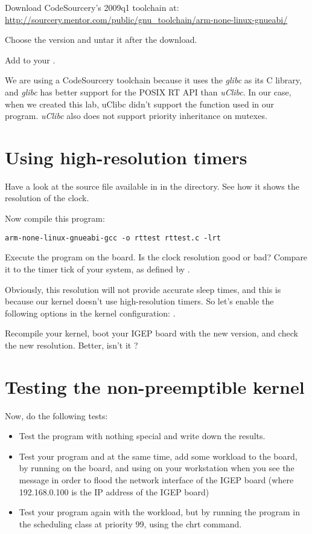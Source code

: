 Download CodeSourcery's 2009q1 toolchain at:
\url{http://sourcery.mentor.com/public/gnu_toolchain/arm-none-linux-gnueabi/}

Choose the 
version and untar it after the download.

Add  to your
.

We are using a CodeSourcery toolchain because it uses the {\em glibc}
as its C library, and {\em glibc} has better support for the POSIX RT
API than {\em uClibc}. In our case, when we created this lab, uClibc
didn't support the  function used in our
 program. {\em uClibc} also does not support priority
inheritance on mutexes.

\section{Using high-resolution timers}

Have a look at the  source file available in  in
the  directory. See how it shows the resolution of the
 clock.

Now compile this program:
\begin{verbatim}
arm-none-linux-gnueabi-gcc -o rttest rttest.c -lrt
\end{verbatim}

Execute the program on the board. Is the clock resolution good or bad?
Compare it to the timer tick of your system, as defined by .

Obviously, this resolution will not provide accurate sleep times, and
this is because our kernel doesn't use high-resolution timers. So
let's enable the following options in the kernel configuration:
.

Recompile your kernel, boot your IGEP board with the new version, and
check the new resolution. Better, isn't it ?

\section{Testing the non-preemptible kernel}

Now, do the following tests:
\begin{itemize}
\item Test the program with nothing special and write down the
  results.
\item Test your program and at the same time, add some workload to the
  board, by running  on the board,
  and using  on your workstation when
  you see the message  in order to
  flood the network interface of the IGEP board (where 192.168.0.100
  is the IP address of the IGEP board)
\item Test your program again with the workload, but by running the
  program in the  scheduling class at priority 99,
  using the chrt command.
\end{itemize}

